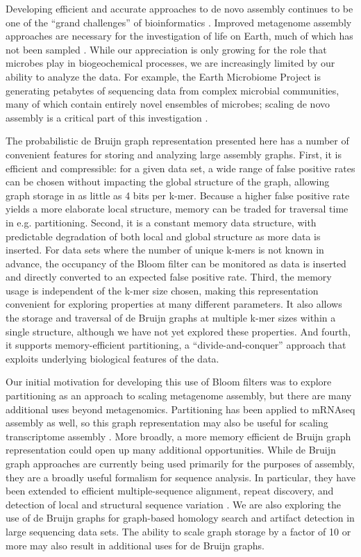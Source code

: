 \documentclass{pnastwo}
\begin{document}
\begin{article}

Developing efficient and accurate approaches to de novo assembly
continues to be one of the ``grand challenges'' of bioinformatics
\cite{pubmed22147368}.  Improved metagenome assembly approaches are
necessary for the investigation of life on Earth, much
of which has not been sampled \cite{terabasemetag}.  While our appreciation is
only growing for the role that microbes play in biogeochemical processes,
we are increasingly limited by our ability to analyze the data.  For
example, the Earth Microbiome Project is generating petabytes of
sequencing data from complex microbial communities, many of which
contain entirely novel ensembles of microbes; scaling de novo assembly
is a critical part of this investigation \cite{emp2010}.

The probabilistic de Bruijn graph representation presented here has a
number of convenient features for storing and analyzing large assembly
graphs.  First, it is efficient and compressible: for a given data
set, a wide range of false positive rates can be chosen without
impacting the global structure of the graph, allowing graph storage in
as little as 4 bits per k-mer.  Because a higher false positive rate
yields a more elaborate local structure, memory can be traded for
traversal time in e.g. partitioning.  Second, it is a constant memory
data structure, with predictable degradation of both local and global
structure as more data is inserted.  For data sets where the number of
unique k-mers is not known in advance, the occupancy of the Bloom
filter can be monitored as data is inserted and directly converted
to an expected false positive rate.  Third, the memory usage is
independent of the k-mer size chosen, making this representation
convenient for exploring properties at many different parameters.  It
also allows the storage and traversal of de Bruijn graphs at multiple
k-mer sizes within a single structure, although we have not yet
explored these properties.  And fourth, it supports memory-efficient
partitioning, a ``divide-and-conquer'' approach that exploits underlying biological features of
the data.

Our initial motivation for developing this use of Bloom filters was to
explore partitioning as an approach to scaling metagenome assembly,
but there are many additional uses beyond metagenomics.  Partitioning
has been applied to mRNAseq assembly as well, so this graph representation may also be
useful for scaling transcriptome assembly \cite{trinity}.
More broadly, a more memory efficient de Bruijn graph representation could open up
many additional opportunities.  While de Bruijn graph approaches are currently
being used primarily for the purposes of assembly, they are a broadly
useful formalism for sequence analysis. In particular, they have been
extended to efficient multiple-sequence alignment,
repeat discovery, and detection of local and
structural sequence variation \cite{zerbinothesis,zhang2003dna,price2005novo}.  We are also
exploring the use of de Bruijn graphs for graph-based homology search
and artifact detection in large sequencing data sets.  The ability to
scale graph storage by a factor of 10 or more may also result in
additional uses for de Bruijn graphs.


\end{article}
\end{document}
